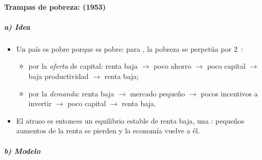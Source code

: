 \documentclass[11pt]{article}
\begin{document}
\paragraph{Trampas de pobreza:  (1953)}

\subparagraph{a) Idea}

\begin{itemize}
\item Un país es pobre porque es pobre: para \textcite{Nurkse1953}, la pobreza se perpetúa por 2~:
  \begin{itemize}
  \item por la \emph{oferta} de capital: renta baja $\to$ poco ahorro $\to$ poco capital $\to$ baja productividad $\to$ renta baja;
  \item por la \emph{demanda}: renta baja $\to$ mercado pequeño $\to$ pocos incentivos a invertir $\to$ poco capital $\to$ renta baja.
  \end{itemize}
\item El atraso es entonces un equilibrio estable de renta baja, una : pequeños aumentos de la renta se pierden y la economía vuelve a él.
\end{itemize}

\subparagraph{b) Modelo}
\end{document}
